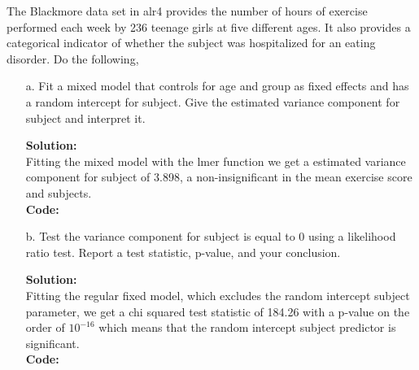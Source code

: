 \documentclass[12pt]{article}
\makeatletter
\theoremstyle{homework}
\newenvironment{exercise}[1]
{\def\@currentlabel{#1}\exercisecore}
{\endexercisecore}
\newcommand{\localhead}[1]{\par\smallskip\noindent\textbf{#1}\nobreak\\}%
\newcommand\solution{\localhead{Solution:}}
\makeatother
\begin{document}
\begin{exercise}{3.} The Blackmore data set in alr4 provides the number of hours of exercise performed each week by 236
  teenage girls at five different ages. It also provides a categorical indicator of whether the subject was hospitalized for an eating 
  disorder. Do the following, 
  \begin{enumerate}
    \item[a.] Fit a mixed model that controls for age and group as fixed effects and has a random intercept for subject. Give the estimated 
    variance component for subject and interpret it.\\
    \solution Fitting the mixed model with the lmer function we get a estimated variance component for subject of 3.898, a non-insignificant in the mean exercise score 
    and subjects. \\
    \textbf{Code:}
    \begin{center}
      
      \end{center} 
    \newpage

    \item[b.] Test the variance component for subject is equal to 0 using a likelihood ratio test. Report a test statistic, p-value, and your conclusion.\\ 
    \solution Fitting the regular fixed model, which excludes the random intercept subject parameter, we get a chi squared test statistic of 184.26 with a p-value on the order of 
    $10^{-16}$ which means that the random intercept subject predictor is significant. \\
    \textbf{Code:}
    \begin{center}
      
      \end{center} 
    \newpage


\end{enumerate}
\end{exercise}
\end{document}
